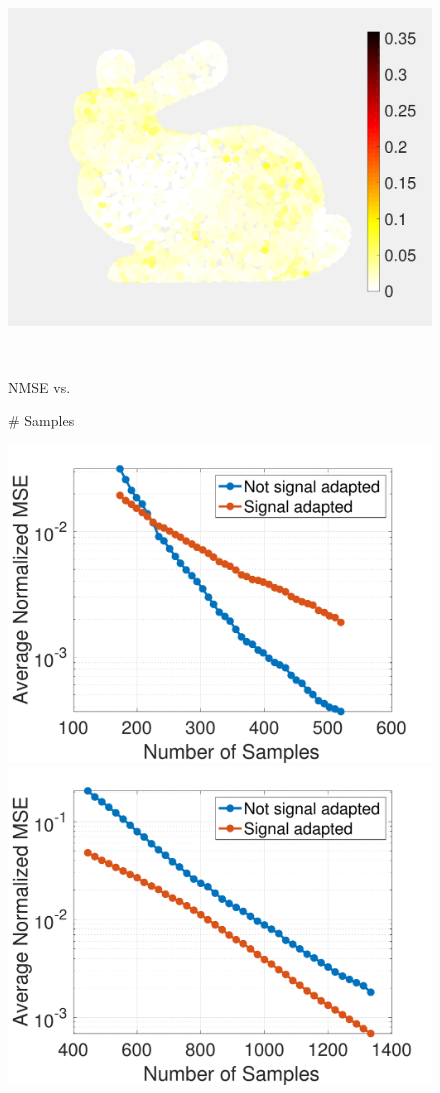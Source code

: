 \documentclass[journal, 10pt]{IEEEtran}
\begin{document}
{\begin{figure}[H]
\begin{minipage}[m]{0.4\linewidth}
\end{minipage}
\begin{minipage}[m]{0.4\linewidth}
\centerline{\includegraphics[width=.85\linewidth]{fig_rec_band_error_adapted}}
\end{minipage} \\
\begin{minipage}[m]{0.16\linewidth}
\centerline{\small{NMSE vs.}}
\centerline{\small{\# Samples}}
\end{minipage} 
\begin{minipage}[m]{0.4\linewidth}
\centerline{\includegraphics[width=.85\linewidth]{fig_rec_low_nmse2}}
\end{minipage}
\begin{minipage}[m]{0.4\linewidth}
\centerline{\includegraphics[width=.85\linewidth]{fig_rec_band_nmse2}}

\end{minipage}
\end{figure}}
\end{document}

